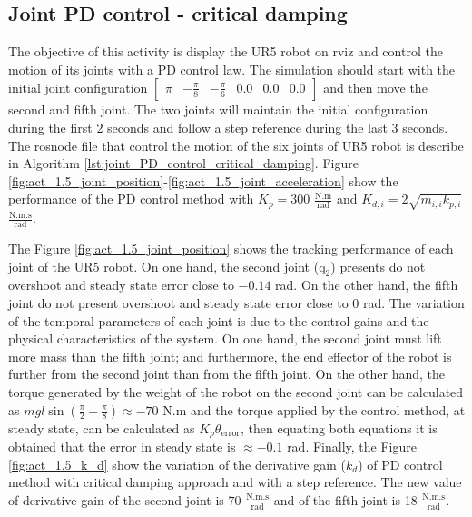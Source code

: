 \subsection{Joint PD control - critical damping}
The objective of this activity is display the UR5 robot on rviz and control the motion of its joints with a PD control law. The simulation should start with the initial joint configuration $\begin{bmatrix} \pi & -\frac{\pi}{8} & -\frac{\pi}{6} & 0.0 & 0.0 & 0.0 \end{bmatrix}$ and then move the second and fifth joint. The two joints will maintain the initial configuration during the first $2$ seconds and follow a step reference during the last $3$ seconds. The rosnode file that control the motion of the six joints of UR5 robot is describe in Algorithm \ref{lst:joint_PD_control_critical_damping}. Figure \ref{fig:act_1.5_joint_position}-\ref{fig:act_1.5_joint_acceleration} show the performance of the PD control method with $K_p=300$ $\mathrm{\frac{N.m}{rad}}$ and $K_{d,i}=2 \sqrt{m_{i,i} k_{p,i}}$ $\mathrm{\frac{N.m.s}{rad}}$. 

The Figure \ref{fig:act_1.5_joint_position} shows the tracking performance of each joint of the UR5 robot. On one hand, the second joint ($\mathrm{q}_2$) presents do not overshoot and steady state error close to $-0.14$ rad. On the other hand, the fifth joint do not present overshoot and steady state error close to $0$ rad. The variation of the temporal parameters of each joint is due to the control gains and the physical characteristics of the system. On one hand, the second joint must lift more mass than the fifth joint; and furthermore, the end effector of the robot is further from the second joint than from the fifth joint. On the other hand, the torque generated by the weight of the robot on the second joint can be calculated as $m g l \sin({\frac{\pi}{2} + \frac{\pi}{8}}) \approx -70$ N.m and the torque applied by the control method, at steady state, can be calculated as $K_p \theta_{\mathrm{error}}$, then equating both equations it is obtained that the error in steady state is $\approx -0.1$ rad. Finally, the Figure \ref{fig:act_1.5_k_d} show the variation of the derivative gain ($k_d$) of PD control method with critical damping approach and with a step reference. The new value of derivative gain of the second joint is $70$ $\mathrm{\frac{N.m.s}{rad}}$ and of the fifth joint is 18 $\mathrm{\frac{N.m.s}{rad}}$. 

